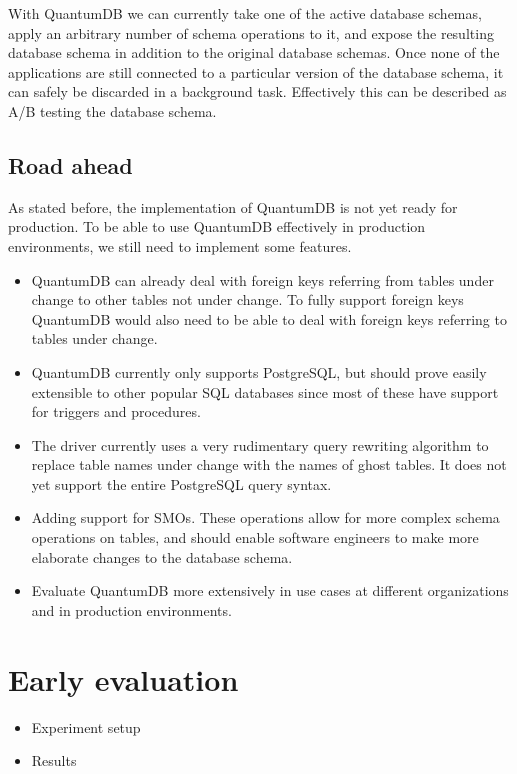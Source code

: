 \documentclass[conference]{IEEEtran}
\begin{document}
With QuantumDB we can currently take one of the active database schemas, apply an arbitrary number of schema operations to it, and expose the resulting database schema in addition to the original database schemas. Once none of the applications are still connected to a particular version of the database schema, it can safely be discarded in a background task. Effectively this can be described as A/B testing the database schema.

\subsection{Road ahead}

As stated before, the implementation of QuantumDB is not yet ready for production. To be able to use QuantumDB effectively in production environments, we still need to implement some features. 

\begin{itemize}
  \item{QuantumDB can already deal with foreign keys referring from tables under change to other tables not under change. To fully support foreign keys QuantumDB would also need to be able to deal with foreign keys referring to tables under change.}
  \item{QuantumDB currently only supports PostgreSQL, but should prove easily extensible to other popular SQL databases since most of these have support for triggers and procedures.}
  \item{The driver currently uses a very rudimentary query rewriting algorithm to replace table names under change with the names of ghost tables. It does not yet support the entire PostgreSQL query syntax.}
  \item{Adding support for SMOs. These operations allow for more complex schema operations on tables, and should enable software engineers to make more elaborate changes to the database schema.}
  \item{Evaluate QuantumDB more extensively in use cases at different organizations and in production environments.}
\end{itemize}

\section{Early evaluation} %

\begin{itemize}
  \item{Experiment setup}
  \item{Results}
\end{itemize}
\end{document}
